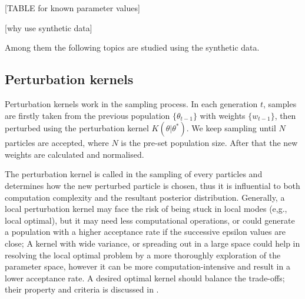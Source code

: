 [TABLE for known parameter values]

[why use synthetic data]

Among them the following topics are studied using the synthetic data.

\subsection{Perturbation kernels}

Perturbation kernels work in the sampling process. In each generation $t$, samples are firstly taken from the previous population $\{\theta_{t-1}\}$ with weights $\{w_{t-1}\}$, then perturbed using the perturbation kernel $K(\theta|\theta^*)$. We keep sampling until $N$ particles are accepted, where $N$ is the pre-set population size. After that the new weights are calculated and normalised.




The perturbation kernel is called in the sampling of every particles and determines how the new perturbed particle is chosen, thus it is influential to both computation complexity and the resultant posterior distribution. Generally, a local perturbation kernel may face the risk of being stuck in local modes (e,g., local optimal), but it may need less computational operations, or could generate a population with a higher acceptance rate if the successive epsilon values are close; A kernel with wide variance, or spreading out in a large space could help in resolving the local optimal problem by a more thoroughly exploration of the parameter space, however it can be more computation-intensive and result in a lower acceptance rate. A desired optimal kernel should balance the trade-offs; their property and criteria is discussed in \cite{ref:kernel}.


